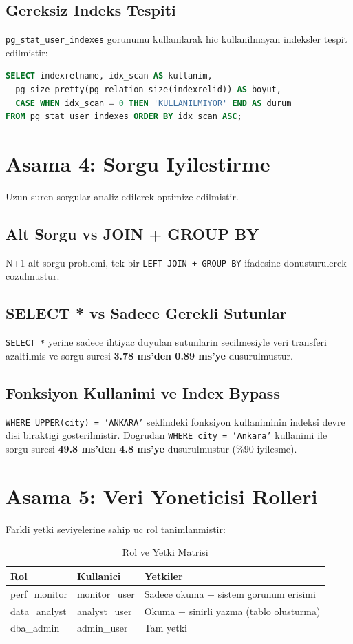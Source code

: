 \documentclass[12pt,a4paper]{article}
\begin{document}
\subsection{Gereksiz Indeks Tespiti}
\texttt{pg\_stat\_user\_indexes} gorunumu kullanilarak hic kullanilmayan indeksler tespit edilmistir:
\begin{lstlisting}[language=SQL, caption=Kullanilmayan Indeks Tespiti]
SELECT indexrelname, idx_scan AS kullanim,
  pg_size_pretty(pg_relation_size(indexrelid)) AS boyut,
  CASE WHEN idx_scan = 0 THEN 'KULLANILMIYOR' END AS durum
FROM pg_stat_user_indexes ORDER BY idx_scan ASC;
\end{lstlisting}

\section{Asama 4: Sorgu Iyilestirme}
Uzun suren sorgular analiz edilerek optimize edilmistir.

\subsection{Alt Sorgu vs JOIN + GROUP BY}
N+1 alt sorgu problemi, tek bir \texttt{LEFT JOIN + GROUP BY} ifadesine donusturulerek cozulmustur.

\subsection{SELECT * vs Sadece Gerekli Sutunlar}
\texttt{SELECT *} yerine sadece ihtiyac duyulan sutunlarin secilmesiyle veri transferi azaltilmis ve sorgu suresi \textbf{3.78 ms'den 0.89 ms'ye} dusurulmustur.

\subsection{Fonksiyon Kullanimi ve Index Bypass}
\texttt{WHERE UPPER(city) = 'ANKARA'} seklindeki fonksiyon kullaniminin indeksi devre disi biraktigi gosterilmistir. Dogrudan \texttt{WHERE city = 'Ankara'} kullanimi ile sorgu suresi \textbf{49.8 ms'den 4.8 ms'ye} dusurulmustur (\%90 iyilesme).

\section{Asama 5: Veri Yoneticisi Rolleri}
Farkli yetki seviyelerine sahip uc rol tanimlanmistir:

\begin{table}[h]
\centering
\begin{tabular}{|l|l|l|}
\hline
\textbf{Rol} & \textbf{Kullanici} & \textbf{Yetkiler} \\
\hline
perf\_monitor & monitor\_user & Sadece okuma + sistem gorunum erisimi \\
data\_analyst & analyst\_user & Okuma + sinirli yazma (tablo olusturma) \\
dba\_admin & admin\_user & Tam yetki \\
\hline
\end{tabular}
\caption{Rol ve Yetki Matrisi}
\end{table}
\end{document}
